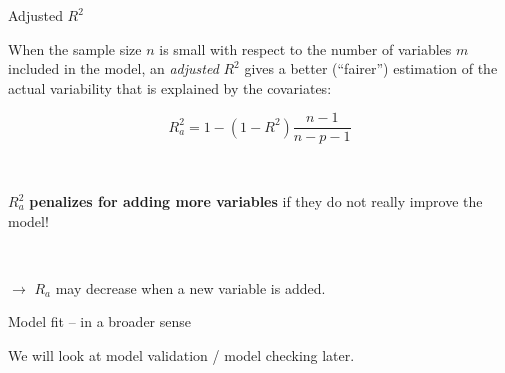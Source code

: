 \documentclass[
  10pt,
  ignorenonframetext,
]{beamer}
\begin{document}
\begin{frame}
\begin{block}{Adjusted \(R^2\)}
\protect\hypertarget{adjusted-r2}{}
\(~\)

When the sample size \(n\) is small with respect to the number of
variables \(m\) included in the model, an \emph{adjusted} \(R^2\) gives
a better (``fairer'') estimation of the actual variability that is
explained by the covariates:

\begin{equation*}
R^2_a = 1-(1-R^2 )\frac{n-1}{n-p-1}
\end{equation*}

\(~\)

\(R^2_a\) \textbf{penalizes for adding more variables} if they do not
really improve the model!

\(~\)

\(\rightarrow\) \(R_a\) may decrease when a new variable is added.
\end{block}
\end{frame}

\begin{frame}
\begin{block}{Model fit -- in a broader sense}
\protect\hypertarget{model-fit-in-a-broader-sense}{}
\(~\)

We will look at model validation / model checking later.
\end{block}
\end{frame}
\end{document}
